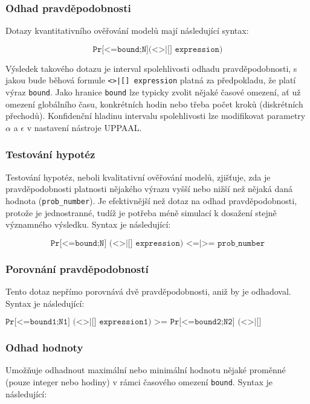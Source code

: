 \subsubsection{Odhad pravděpodobnosti}
Dotazy kvantitativního ověřování modelů mají následující syntax:

\begin{equation*}
    \texttt{Pr[<=bound;N](<>|[] expression)}
\end{equation*}

Výsledek takového dotazu je interval spolehlivosti odhadu pravděpodobnosti, s jakou bude běhová formule \texttt{<>|[] expression} platná za předpokladu, že platí výraz \texttt{bound}. Jako hranice \texttt{bound} lze typicky zvolit nějaké časové omezení, ať už omezení globálního času, konkrétních hodin nebo třeba počet kroků (diskrétních přechodů). Konfidenční hladinu intervalu spolehlivosti lze modifikovat parametry $\alpha$ a $\epsilon$ v nastavení nástroje UPPAAL.

\subsubsection{Testování hypotéz}
Testování hypotéz, neboli kvalitativní ověřování modelů, zjišťuje, zda je pravděpodobnosti platnosti nějakého výrazu vyšší nebo nižší než nějaká daná hodnota (\texttt{prob\_number}). Je efektivnější než dotaz na odhad pravděpodobnosti, protože je jednostranné, tudíž je potřeba méně simulací k dosažení stejně významného výsledku. Syntax je následující:

\begin{equation*}
    \texttt{Pr[<=bound;N] (<>|[] expression) <=|>= prob\_number}
\end{equation*}

\subsubsection{Porovnání pravděpodobností}
Tento dotaz nepřímo porovnává dvě pravděpodobnosti, aniž by je odhadoval. Syntax je následující:

\begin{equation*}
    \texttt{Pr[<=bound1;N1] (<>|[] expression1) >= Pr[<=bound2;N2] (<>|[] expression2)}
\end{equation*}

\subsubsection{Odhad hodnoty}
Umožňuje odhadnout maximální nebo minimální hodnotu nějaké proměnné (pouze integer nebo hodiny) v rámci časového omezení \texttt{bound}. Syntax je následující:

